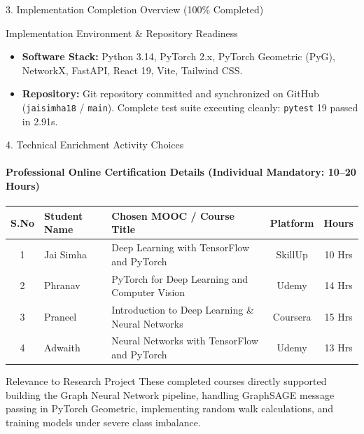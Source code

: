 \documentclass[aspectratio=169, 11pt]{beamer}
\begin{document}
\begin{frame}{3. Implementation Completion Overview (100\% Completed)}
    \begin{block}{Implementation Environment \& Repository Readiness}
        \scriptsize
        \begin{itemize}\setlength{\itemsep}{1pt}\setlength{\parskip}{0pt}
            \item \textbf{Software Stack:} Python 3.14, PyTorch 2.x, PyTorch Geometric (PyG), NetworkX, FastAPI, React 19, Vite, Tailwind CSS.
            \item \textbf{Repository:} Git repository committed and synchronized on GitHub (\texttt{jaisimha18} / \texttt{main}). Complete test suite executing cleanly: \texttt{pytest} 19 passed in 2.91s.
        \end{itemize}
    \end{block}
\end{frame}

\begin{frame}{4. Technical Enrichment Activity Choices}
    \framesubtitle{Professional Online Certification Details (Individual Mandatory: 10--20 Hours)}
    \vspace{-0.2cm}
    \begin{table}
        \centering
        \small
        \renewcommand{\arraystretch}{1.15}
        \begin{tabular}{|c|l|p{6.2cm}|c|c|}
            \hline
            \textbf{S.No} & \textbf{Student Name} & \textbf{Chosen MOOC / Course Title} & \textbf{Platform} & \textbf{Hours} \\
            \hline
            1 & Jai Simha & Deep Learning with TensorFlow and PyTorch & SkillUp & 10 Hrs \\
            \hline
            2 & Phranav & PyTorch for Deep Learning and Computer Vision & Udemy & 14 Hrs \\
            \hline
            3 & Praneel & Introduction to Deep Learning \& Neural Networks & Coursera & 15 Hrs \\
            \hline
            4 & Adwaith & Neural Networks with TensorFlow and PyTorch & Udemy & 13 Hrs \\
            \hline
        \end{tabular}
    \end{table}
    \vspace{0.15cm}

    \begin{block}{Relevance to Research Project}
        \footnotesize
        These completed courses directly supported building the Graph Neural Network pipeline, handling GraphSAGE message passing in PyTorch Geometric, implementing random walk calculations, and training models under severe class imbalance.
    \end{block}
\end{frame}
\end{document}
